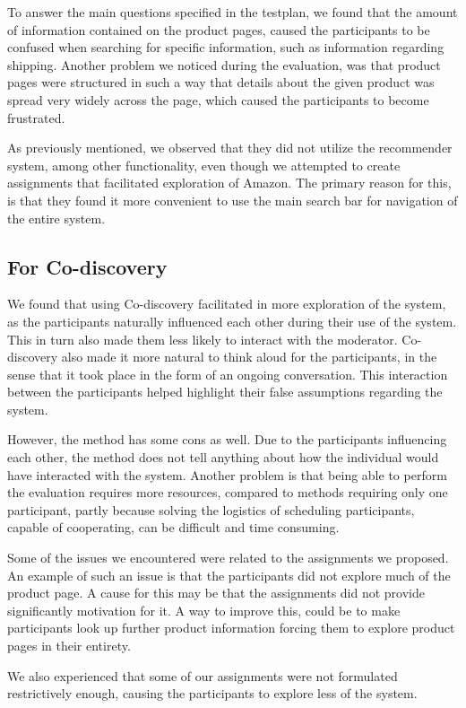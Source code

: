 To answer the main questions specified in the testplan, we found that the amount of information contained on the product pages, caused the participants to be confused when searching for specific information, such as information regarding shipping. Another problem we noticed during the evaluation, was that product pages were structured in such a way that details about the given product was spread very widely across the page, which caused the participants to become frustrated.

As previously mentioned, we observed that they did not utilize the recommender system, among other functionality, even though we attempted to create assignments that facilitated exploration of Amazon. The primary reason for this, is that they found it more convenient to use the main search bar for navigation of the entire system. 

\subsection{For Co-discovery}
We found that using Co-discovery facilitated in more exploration of the system, as the participants naturally influenced each other during their use of the system. This in turn also made them less likely to interact with the moderator. Co-discovery also made it more natural to think aloud for the participants, in the sense that it took place in the form of an ongoing conversation. This interaction between the participants helped highlight their false assumptions regarding the system. 

However, the method has some cons as well. Due to the participants influencing each other, the method does not tell anything about how the individual would have interacted with the system. Another problem is that being able to perform the evaluation requires more resources, compared to methods requiring only one participant, partly because solving the logistics of scheduling participants, capable of cooperating, can be difficult and time consuming.

Some of the issues we encountered were related to the assignments we proposed. An example of such an issue is that the participants did not explore much of the product page. A cause for this may be that the assignments did not provide significantly motivation for it. A way to improve this, could be to make participants look up further product information forcing them to explore product pages in their entirety. 

We also experienced that some of our assignments were not formulated restrictively enough, causing the participants to explore less of the system.

